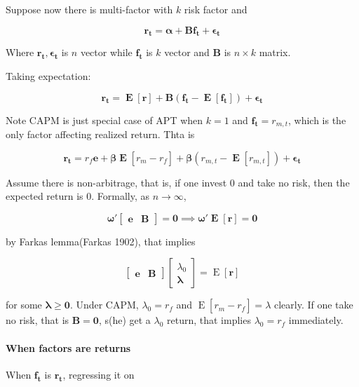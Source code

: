 \documentclass{article}
\begin{document}
Suppose now there is multi-factor with \(k\) risk factor and

\[ \bm{\mathbf{r_t=\alpha+Bf_t+\epsilon_t}} \]

Where \(\bm{\mathbf{r_t,\epsilon_t}}\) is \(n\) vector while
\(\bm{\mathbf{f_t}}\) is \(k\) vector and \(\bm{\mathbf{B}}\) is
\(n\times k\) matrix.

Taking expectation:

\[ \bm{\mathbf{r_t=\mathop{\text{E}}[r]+B(f_t-\mathop{\text{E}}[f_t])+\epsilon_t}} \]

Note CAPM is just special case of APT when \(k=1\) and
\(\bm{\mathbf{f_t}}=r_{m,t}\), which is the only factor affecting
realized return. Thta is

\[ \bm{\mathbf{r_t=\mathit{r_f}e+\beta \mathop{\text{E}}[\mathit{r_{m}-r_f}]+\beta(\mathit{r_{m,t}}-\mathop{\text{E}}[\mathit{r_{m,t}}])+\epsilon_t}} \]

Assume there is non-arbitrage, that is, if one invest \(0\) and take no
risk, then the expected return is \(0\). Formally, as \(n\to \infty\),

\[ \bm{\mathbf{\omega'\begin{bmatrix}
  \bm{\mathbf{e}}&\bm{\mathbf{B}}
\end{bmatrix}=0\implies\omega'\mathop{\text{E}}[r]=0}} \]

by Farkas lemma(Farkas 1902), that implies

\[ \begin{bmatrix}
  \bm{\mathbf{e}}&\bm{\mathbf{B}}
\end{bmatrix}\begin{bmatrix}
  \lambda_0\\\bm{\mathbf{\lambda}}
\end{bmatrix}=\mathop{\text{E}}[\bm{\mathbf{r}}] \]

for some \(\bm{\mathbf{\lambda\ge 0}}\). Under CAPM, \(\lambda_0=r_f\)
and \(\mathop{\text{E}}[\mathit{r_{m}-r_f}]=\lambda\) clearly. If one
take no risk, that is \(\bm{\mathbf{B=0}}\), s(he) get a \(\lambda_0\)
return, that implies \(\lambda_0=r_f\) immediately.

\hypertarget{when-factors-are-returns}{%
\paragraph{When factors are returns}\label{when-factors-are-returns}}

When \(\bm{\mathbf{f_t}}\) is \(\bm{\mathbf{r_t}}\), regressing it on
\end{document}
